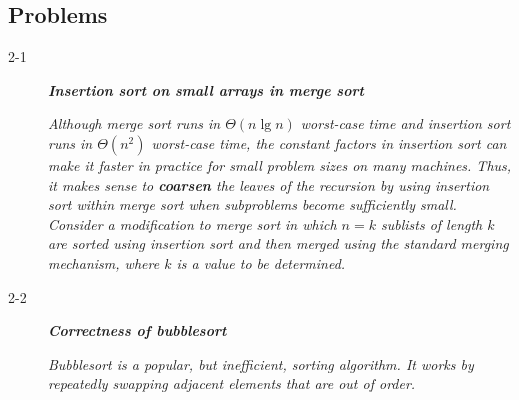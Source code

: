 \subsection{Problems}

\begin{description}
  \item[2-1] {\bfseries \itshape Insertion sort on small arrays in merge sort}

    {\itshape Although merge sort runs in $\Theta(n \lg n)$ worst-case time and insertion sort runs in $\Theta(n^2)$ worst-case time, the constant factors in insertion sort can make it faster in practice for small problem sizes on many machines. Thus, it makes sense to {\bfseries coarsen} the leaves of the recursion by using insertion sort within merge sort when subproblems become sufficiently small. Consider a modification to merge sort in which $n=k$ sublists of length $k$ are sorted using insertion sort and then merged using the standard merging mechanism, where $k$ is a value to be determined.
    }

    \begin{pbrev}
      
    \end{pbrev}

  \item[2-2] {\bfseries \itshape Correctness of bubblesort}

    {\itshape Bubblesort is a popular, but inefficient, sorting algorithm. It works by repeatedly
    swapping adjacent elements that are out of order.}

    \begin{pbrev}
      
    \end{pbrev}


\end{description}
